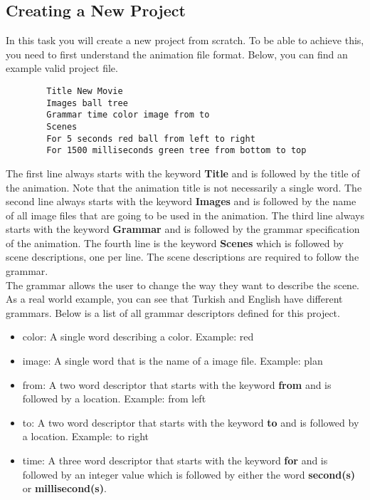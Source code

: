 \documentclass[a4paper]{article}
\begin{document}
	
	\subsection{Creating a New Project}
	In this task you will create a new project from scratch. To be able to achieve this, you need to first understand the animation file format. Below, you can find an example valid project file.\\
	
	\begin{lstlisting}
		Title New Movie
		Images ball tree
		Grammar time color image from to
		Scenes
		For 5 seconds red ball from left to right
		For 1500 milliseconds green tree from bottom to top
	\end{lstlisting}
	
	The first line always starts with the keyword \textbf{Title} and is followed by the title of the animation. Note that the animation title is not necessarily a single word. The second line always starts with the keyword \textbf{Images} and is followed by the name of all image files that are going to be used in the animation. The third line always starts with the keyword \textbf{Grammar} and is followed by the grammar specification of the animation. The fourth line is the keyword \textbf{Scenes} which is followed by scene descriptions, one per line. The scene descriptions are required to follow the grammar.\\
	
	The grammar allows the user to change the way they want to describe the scene. As a real world example, you can see that Turkish and English have different grammars. Below is a list of all grammar descriptors defined for this project.
	\label{grammar}
	\begin{itemize}
		\item color: A single word describing a color. Example: red
		\item image: A single word that is the name of a image file. Example: plan
		\item from: A two word descriptor that starts with the keyword \textbf{from} and is followed by a location. Example: from left
		\item to: A two word descriptor that starts with the keyword \textbf{to} and is followed by a location. Example: to right
		\item time: A three word descriptor that starts with the keyword \textbf{for} and is followed by an integer value which is followed by either the word \textbf{second(s)} or \textbf{millisecond(s)}.
	\end{itemize}
\end{document}
